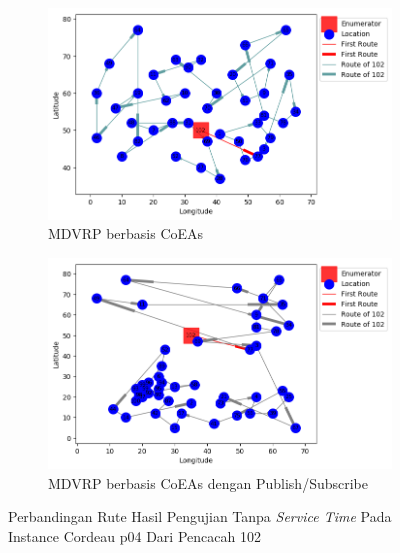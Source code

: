 \begin{figure}[H]
	\centering
	\begin{subfigure}[t]{\textwidth}
		\centering
		\includegraphics[width=\textwidth]{Resources/Images/cordeau_p04/cordeau_p04_notw_102_coes}
		\caption{MDVRP berbasis CoEAs}
		\label{fig:cordeau_p04_notw_102_coes}
	\end{subfigure}
	\begin{subfigure}[t]{\textwidth}
		\centering
		\includegraphics[width=\textwidth]{Resources/Images/cordeau_p04/cordeau_p04_notw_102_pubsub_coes}
		\caption{MDVRP berbasis CoEAs dengan Publish/Subscribe}
		\label{fig:cordeau_p04_notw_102_pubsub_coes}
	\end{subfigure}
	\caption{Perbandingan Rute Hasil Pengujian Tanpa \textit{Service Time} Pada Instance Cordeau p04 Dari Pencacah 102}
	\label{fig:cordeau_p04_notw_102}
\end{figure}



